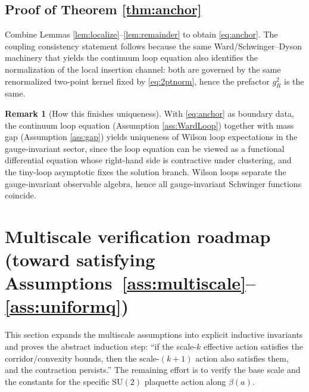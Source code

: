 \documentclass[11pt]{article}
\theoremstyle{definition}
\newtheorem{remark}[theorem]{Remark}
\newcommand{\SU}{\mathrm{SU}}
\newcommand{\1}{\mathbf{1}}
\begin{document}
\subsection{Proof of Theorem \ref{thm:anchor}}
Combine Lemmas \ref{lem:localize}--\ref{lem:remainder} to obtain \eqref{eq:anchor}. The coupling consistency statement follows
because the same Ward/Schwinger--Dyson machinery that yields the continuum loop equation also identifies the normalization of the
local insertion channel: both are governed by the same renormalized two-point kernel fixed by \eqref{eq:2ptnorm}, hence the
prefactor $g_R^2$ is the same.

\begin{remark}[How this finishes uniqueness]
With \eqref{eq:anchor} as boundary data, the continuum loop equation (Assumption \ref{ass:WardLoop}) together with mass gap
(Assumption \ref{ass:gap}) yields uniqueness of Wilson loop expectations in the gauge-invariant sector, since the loop equation
can be viewed as a functional differential equation whose right-hand side is contractive under clustering, and the tiny-loop
asymptotic fixes the solution branch. Wilson loops separate the gauge-invariant observable algebra, hence all gauge-invariant
Schwinger functions coincide.
\end{remark}

\section{Multiscale verification roadmap (toward satisfying Assumptions~\ref{ass:multiscale}--\ref{ass:uniformq})}
\label{sec:verification}
This section expands the multiscale assumptions into explicit inductive invariants and proves the abstract induction step: “if the scale-$k$ effective action satisfies the corridor/convexity bounds, then the scale-$(k+1)$ action also satisfies them, and the contraction persists.” The remaining effort is to verify the base scale and the constants for the specific $\SU(2)$ plaquette action along $\beta(a)$.
\end{document}
